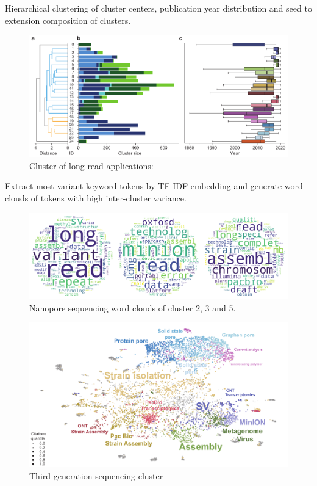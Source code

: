 Hierarchical clustering of cluster centers, publication year distribution and seed to extension composition of clusters.

\begin{figure}[h]
	\centering
	\includegraphics[width=1.0\textwidth]{figures/state_of_art/cluster_sizes.pdf}
	\captionsetup{format=plain}
	\caption[Long-Read Application Cluster]{Cluster of long-read applications:}
	\label{fig:state_of_art:cluster_sizes}
\end{figure}

Extract most variant keyword tokens by TF-IDF embedding and generate word clouds of tokens with high inter-cluster variance.

\begin{figure}[h]
	\centering
	\includegraphics[width=1.0\textwidth]{figures/state_of_art/wcs_minion.pdf}
	\captionsetup{format=plain}
	\caption[Nanopore Sequencing Wordclouds]{Nanopore sequencing word clouds of cluster 2, 3 and 5.}
	\label{fig:state_of_art:wcs_minion}
\end{figure}

\begin{figure}[h]
	\centering
	\includegraphics[width=1.0\textwidth]{figures/state_of_art/umap_cluster.pdf}
	\captionsetup{format=plain}
	\caption[Third generation sequencing cluster]{Third generation sequencing cluster}
	\label{fig:state_of_art:umap_cluster}
\end{figure}

